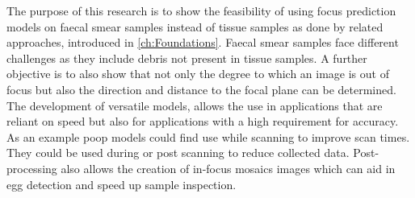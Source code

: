 The purpose of this research is to show the feasibility of using focus prediction models on faecal smear samples instead of tissue samples as done by related approaches, introduced in \autoref{ch:Foundations}. Faecal smear samples face different challenges as they include debris not present in tissue samples.
A further objective is to also show that not only the degree to which an image is out of focus but also the direction and distance to the focal plane can be determined. The development of versatile models, allows the use in applications that are reliant on speed but also for applications with a high requirement for accuracy. As an example \ac{poop} models could find use while scanning to improve scan times. They could be used during or post scanning to reduce collected data. Post-processing also allows the creation of in-focus mosaics images which can aid in egg detection and speed up sample inspection.
